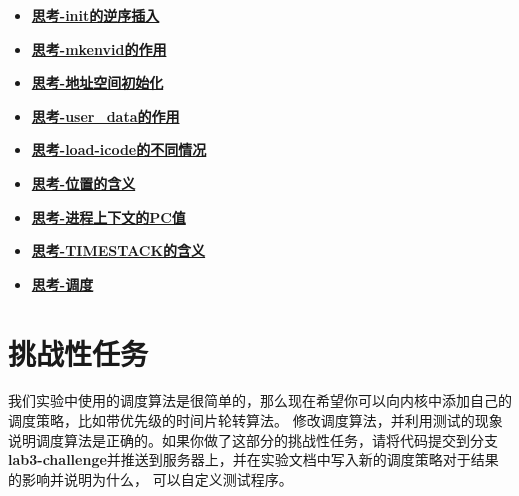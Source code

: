 \begin{itemize}
\item \hyperref[think-env_init]{\textbf{\textcolor{baseB}{思考-init的逆序插入}}}
\item \hyperref[think-mkenvid]{\textbf{\textcolor{baseB}{思考-mkenvid的作用}}}
\item \hyperref[think-env_setup_vm]{\textbf{\textcolor{baseB}{思考-地址空间初始化}}}
\item \hyperref[think-user-data]{\textbf{\textcolor{baseB}{思考-user\_data的作用}}}
\item \hyperref[think-load-icode]{\textbf{\textcolor{baseB}{思考-load-icode的不同情况}}}
\item \hyperref[think-位置]{\textbf{\textcolor{baseB}{思考-位置的含义}}}
\item \hyperref[think-pc]{\textbf{\textcolor{baseB}{思考-进程上下文的PC值}}}
\item \hyperref[think-TIMESTACK]{\textbf{\textcolor{baseB}{思考-TIMESTACK的含义}}}
\item \hyperref[think-调度]{\textbf{\textcolor{baseB}{思考-调度}}}
\end{itemize}

\section{挑战性任务}
我们实验中使用的调度算法是很简单的，那么现在希望你可以向内核中添加自己的调度策略，比如带优先级的时间片轮转算法。
修改调度算法，并利用测试的现象说明调度算法是正确的。如果你做了这部分的挑战性任务，请将代码提交到分支
\textbf{lab3-challenge}并推送到服务器上，并在实验文档中写入新的调度策略对于结果的影响并说明为什么，
可以自定义测试程序。

